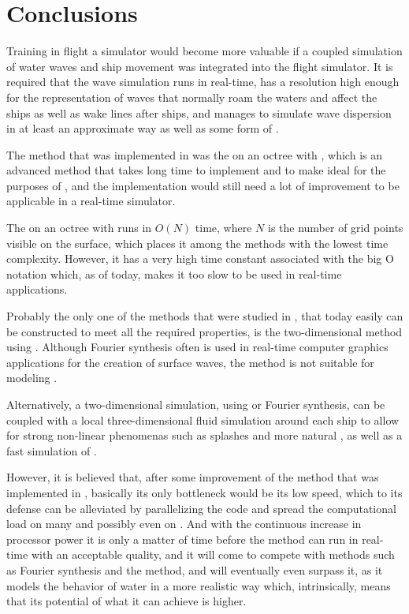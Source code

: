 \chapter{Conclusions}

Training in flight a simulator would become more valuable if a coupled simulation of water waves and ship movement was integrated into the flight simulator. It is required that the wave simulation runs in real-time, has a resolution high enough for the representation of waves that normally roam the waters and affect the ships as well as wake lines after ships, and manages to simulate wave dispersion in at least an approximate way as well as some form of \FSI.

The method that was implemented in \thisprojectwork was the \FVM on an octree with \FSM, which is an advanced method that takes long time to implement and to make ideal for the purposes of \thismasterthesiswork {}\nspace, and the implementation would still need a lot of improvement to be applicable in a real-time simulator.

The \FVM on an octree with \FSM runs in $O(N)$ time, where $N$ is the number of grid points visible on the surface, which places it among the methods with the lowest time complexity. However, it has a very high time constant associated with the big O notation which, as of today, makes it too slow to be used in real-time applications.

Probably the only one of the methods that were studied in \thismasterthesiswork, that today easily can be constructed to meet all the required properties, is the two-dimensional method using \LPD. Although Fourier synthesis often is used in real-time computer graphics applications for the creation of surface waves, the method is not suitable for modeling \FSI.

Alternatively, a two-dimensional simulation, using \LPD or Fourier synthesis, can be coupled with a local three-dimensional fluid simulation around each ship to allow for strong non-linear phenomenas such as splashes and more natural \FSI, as well as a fast simulation of .

However, it is believed that, after some improvement of the method that was implemented in \thisprojectwork, basically its only bottleneck would be its low speed, which to its defense can be alleviated by parallelizing the code and spread the computational load on many \CPUs and possibly even on \GPUs. And with the continuous increase in processor power it is only a matter of time before the method can run in real-time with an acceptable quality, and it will come to compete with methods such as Fourier synthesis and the \LPD method, and will eventually even surpass it, as it models the behavior of water in a more realistic way which, intrinsically,  means that its potential of what it can achieve is higher.